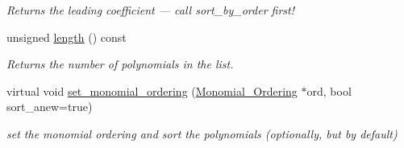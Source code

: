 \begin{Indent}
\begin{DoxyCompactItemize}
\begin{DoxyCompactList}\small\item\em Returns the leading coefficient --- call sort\+\_\+by\+\_\+order first! \end{DoxyCompactList}\item 
\mbox{\label{class_polynomial___linked___list_a11aba922845bcd860d0bffb263fdcc88}} 
unsigned \hyperlink{class_polynomial___linked___list_a11aba922845bcd860d0bffb263fdcc88}{length} () const
\begin{DoxyCompactList}\small\item\em Returns the number of polynomials in the list. \end{DoxyCompactList}\item 
virtual void \hyperlink{class_polynomial___linked___list_a150055edb9ec7b59ec3217fb7f411e6e}{set\+\_\+monomial\+\_\+ordering} (\hyperlink{class_monomial___ordering}{Monomial\+\_\+\+Ordering} $\ast$ord, bool sort\+\_\+anew=true)
\begin{DoxyCompactList}\small\item\em set the monomial ordering and sort the polynomials (optionally, but by default) \end{DoxyCompactList}\end{DoxyCompactItemize}
\end{Indent}
